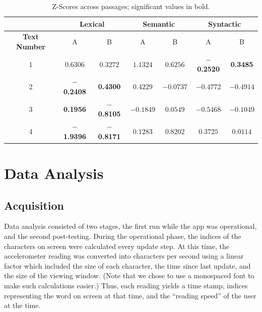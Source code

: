 \documentclass[11pt,letterpaper]{article}
\begin{document}
	
	\begin{table}[t]
		\begin{center}
			\begin{tabular}{*7c}
				\toprule
				 & \multicolumn{2}{c}{\textbf{Lexical}} & \multicolumn{2}{c}{\textbf{Semantic}} & \multicolumn{2}{c}{\textbf{Syntactic}} \\
				\midrule
				\textbf{Text Number} & A & B & A & B & A & B \\
				1 & $ 0.6306 $ & $ 0.3272 $ & $ 1.1324 $ & $ 0.6256 $ & $-$\textbf{0.2520} & \textbf{0.3485} \\
				2 & $-$\textbf{0.2408} & \textbf{0.4300} & $ 0.4229 $ & $ -0.0737 $ & $ -0.4772 $ & $ -0.4914 $ \\
				3 & \textbf{0.1956} & $-$\textbf{0.8105} & $ -0.1849 $ & $ 0.0549 $ & $ -0.5468 $ & $ -0.1049 $ \\
				4 & $-$\textbf{1.9396} & $-$\textbf{0.8171} & $ 0.1283 $ & $ 0.8202 $ & $ 0.3725 $ & $ 0.0114 $ \\
				\bottomrule
			\end{tabular}
		\end{center}
		\caption{Z-Scores across passages; significant values in bold.}
	\end{table}
	
	\section{Data Analysis}
	
	\subsection{Acquisition}
	
	Data analysis consisted of two stages, the first run while the app was operational, and the second post-testing. During the operational phase, the indices of the characters on screen were calculated every update step. At this time, the accelerometer reading was converted into characters per second using a linear factor which included the size of each character, the time since last update, and the size of the viewing window. (Note that we chose to use a monospaced font to make such calculations easier.) Thus, each reading yields a time stamp, indices representing the word on screen at that time, and the ``reading speed'' of the user at the time.
	
\end{document}
